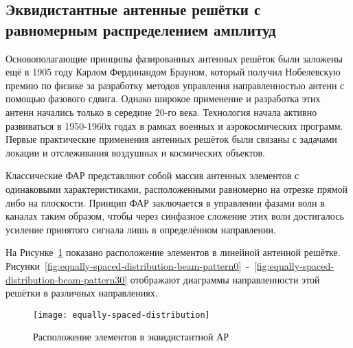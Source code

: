 \subsection{Эквидистантные антенные решётки с равномерным распределением амплитуд}\label{subsect:equally-spaced-arrays}

Основополагающие принципы фазированных антенных решёток были заложены ещё в 1905 году Карлом Фердинандом Брауном, который получил Нобелевскую премию 
по физике за разработку методов управления направленностью антенн с помощью фазового сдвига. Однако широкое применение и разработка этих антенн начались 
только в середине 20-го века. Технология начала активно развиваться в 1950-1960х годах в рамках военных и аэрокосмических программ. Первые практические 
применения антенных решёток были связаны с задачами локации и отслеживания воздушных и космических объектов.

Классические ФАР представляют собой массив антенных элементов с одинаковыми характеристиками, расположенными равномерно
на отрезке прямой либо на плоскости. Принцип ФАР заключается в управлении фазами волн в каналах таким образом,
чтобы через синфазное сложение этих волн достигалось усиление принятого сигнала лишь в определённом направлении. 

На Рисунке~\ref{fig:equally-spaced-distribution-pos} показано расположение элементов в линейной антенной решётке. 
Рисунки~\ref{fig:equally-spaced-distribution-beam-pattern0}~-~\ref{fig:equally-spaced-distribution-beam-pattern30} 
отображают диаграммы направленности этой решётки в различных направлениях.



\begin{figure}[!ht]
    \centering
    \texttt{[image: equally-spaced-distribution]}
    \caption{Расположение элементов в эквидистантной АР}
    \label{fig:equally-spaced-distribution-pos}
\end{figure}



